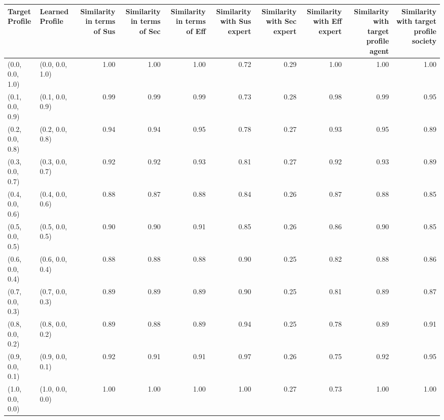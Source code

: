 \begin{tabular}{llrrrrrrrr}
\toprule
Target Profile & Learned Profile & Similarity in terms of Sus & Similarity in terms of Sec & Similarity in terms of Eff & Similarity with Sus expert & Similarity with Sec expert & Similarity with Eff expert & Similarity with target profile agent & Similarity with target profile society \\
\midrule
(0.0, 0.0, 1.0) & (0.0, 0.0, 1.0) & 1.00 & 1.00 & 1.00 & 0.72 & 0.29 & 1.00 & 1.00 & 1.00 \\
(0.1, 0.0, 0.9) & (0.1, 0.0, 0.9) & 0.99 & 0.99 & 0.99 & 0.73 & 0.28 & 0.98 & 0.99 & 0.95 \\
(0.2, 0.0, 0.8) & (0.2, 0.0, 0.8) & 0.94 & 0.94 & 0.95 & 0.78 & 0.27 & 0.93 & 0.95 & 0.89 \\
(0.3, 0.0, 0.7) & (0.3, 0.0, 0.7) & 0.92 & 0.92 & 0.93 & 0.81 & 0.27 & 0.92 & 0.93 & 0.89 \\
(0.4, 0.0, 0.6) & (0.4, 0.0, 0.6) & 0.88 & 0.87 & 0.88 & 0.84 & 0.26 & 0.87 & 0.88 & 0.85 \\
(0.5, 0.0, 0.5) & (0.5, 0.0, 0.5) & 0.90 & 0.90 & 0.91 & 0.85 & 0.26 & 0.86 & 0.90 & 0.85 \\
(0.6, 0.0, 0.4) & (0.6, 0.0, 0.4) & 0.88 & 0.88 & 0.88 & 0.90 & 0.25 & 0.82 & 0.88 & 0.86 \\
(0.7, 0.0, 0.3) & (0.7, 0.0, 0.3) & 0.89 & 0.89 & 0.89 & 0.90 & 0.25 & 0.81 & 0.89 & 0.87 \\
(0.8, 0.0, 0.2) & (0.8, 0.0, 0.2) & 0.89 & 0.88 & 0.89 & 0.94 & 0.25 & 0.78 & 0.89 & 0.91 \\
(0.9, 0.0, 0.1) & (0.9, 0.0, 0.1) & 0.92 & 0.91 & 0.91 & 0.97 & 0.26 & 0.75 & 0.92 & 0.95 \\
(1.0, 0.0, 0.0) & (1.0, 0.0, 0.0) & 1.00 & 1.00 & 1.00 & 1.00 & 0.27 & 0.73 & 1.00 & 1.00 \\
\bottomrule
\end{tabular}
